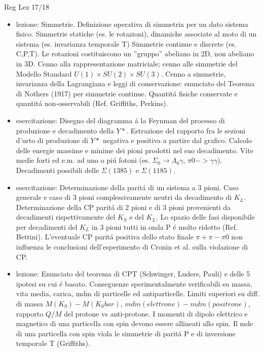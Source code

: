 \begin{frame}[allowframebreaks]{Reg Lez 17/18}
\begin{itemize}
\item lezione: Simmetrie. Definizione operativa di simmetria per un dato sistema fisico. Simmetrie statiche (es. le rotazioni), dinamiche associate al moto di un sistema (es. invarianza temporale T) Simmetrie continue e discrete (es. C,P,T). Le rotazioni costituiscono un ''gruppo'' abeliano in 2D, non abeliano in 3D. Cenno alla rappresentazione matriciale; cenno alle simmetrie del Modello Standard $U(1)\times SU(2)\times SU(3)$. Cenno a simmetrie, invarianza della Lagrangiana e leggi di conservazione: enunciato del Teorema di N\:others (1917) per simmetrie continue. Quantit\'a fisiche conservate e quantit\'a non-osservabili (Ref. Griffiths, Perkins).
\item esercitazione: Disegno del diagramma \'a la Feynman del processo di produzione e decadimento della $Y*$. Estrazione del rapporto fra le sezioni d'urto di produzione di $Y*$ negativa e positiva a partire dal grafico. Calcolo delle energie massime e minime dei pioni prodotti nel suo decadimento. Vite medie forti ed e.m. ad uno o pi\'u fotoni (es. $\Sigma_0\to\Lambda_0 \gamma$, $\pi0->\gamma \gamma$). Decadimenti possibili delle $\Sigma(1385)$ e $\Sigma(1185)$.
\item esercitazione: Determinazione della parit\'a di un sistema a 3 pioni. Caso generale e caso di 3 pioni complessivamente neutri da decadimento di $K_L$. Determinazione della CP parit\'a di 2 pioni e di 3 pioni provenienti da decadimenti rispettivamente del $K_S$ e del $K_L$. Lo spazio delle fasi disponibile per decadimenti del $K_L$ in 3 pioni tutti in onda P \'e molto ridotto (Ref. Bettini). L'eventuale CP parit\'a positiva dello stato finale $\pi+\pi-\pi0$ non influenza le conclusioni dell'esperimento di Cronin et al. sulla violazione di CP.
\item  lezione: Enunciato del teorema di CPT (Schwinger, L\:uders, Pauli) e delle 5 ipotesi su cui \'e basato. Conseguenze sperimentalmente verificabili su massa, vita media, carica, mdm di particelle ed antiparticelle. Limiti superiori su diff. di massa $M(K_0)-M(K_0bar)$, $mdm(elettrone)-mdm(positrone),$ rapporto $Q/M$ del protone vs anti-protone. I momenti di dipolo elettrico e magnetico di una particella con spin devono essere allineati allo spin. Il mde di una particella con spin v\'iola le simmetrie di parit\'a P e di inversione temporale T (Griffiths).

\end{itemize}
\end{frame}
